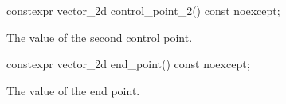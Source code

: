 \begin{itemdecl}
constexpr vector_2d control_point_2() const noexcept;
\end{itemdecl}
\begin{itemdescr}
\pnum
\returns
The value of the second control point.
\end{itemdescr}

\begin{itemdecl}
constexpr vector_2d end_point() const noexcept;
\end{itemdecl}
\begin{itemdescr}
\pnum
\returns
The value of the end point.
\end{itemdescr}

